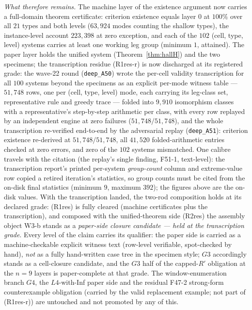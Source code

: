 \emph{What therefore remains.} The machine layer of the existence argument now carries a
full-domain theorem certificate: criterion existence equals layer $0$ at $100\%$ over
all $21$ types and both levels ($63{,}924$ modes counting the shallow types), the
instance-level account $223{,}398$ at zero exception, and each of the $102$
(cell, type, level) systems carries at least one working leg group (minimum $1$,
attained). The paper layer holds the unified system (Theorem~\ref{thm:hallH}) and the
two specimens; the transcription residue \textup{(R1res-r)} is now discharged at its
registered grade: the wave-22 round (\texttt{deep\_A50}) wrote the per-cell validity
transcription for all $100$ systems beyond the specimens as an explicit per-mode
witness table --- $51{,}748$ rows, one per (cell, type, level) mode, each carrying its
leg-class set, representative rule and greedy trace --- folded into $9{,}910$
isomorphism classes with a representative's step-by-step arithmetic per class, with
every row replayed by an independent engine at zero failures
($51{,}748/51{,}748$), and the whole transcription re-verified end-to-end by the
adversarial replay (\texttt{deep\_A51}): criterion existence re-derived at
$51{,}748/51{,}748$, all $41{,}520$ folded-arithmetic entries checked at zero errors,
and zero of the $102$ systems mismatched. One calibre travels with the citation (the
replay's single finding, F51-1, text-level): the transcription report's printed
per-system \emph{group-count} column and extreme-value row copied a retired
iteration's statistics, so group counts must be cited from the on-disk final
statistics (minimum $9$, maximum $392$); the figures above are the on-disk values.
With the transcription landed, the two-rod composition holds at its declared grade:
\textup{(R1res)} is fully cleared (machine certificates plus the transcription), and
composed with the unified-theorem side \textup{(R2res)} the assembly object W3-b
stands as a \emph{paper-side closure candidate --- held at the transcription grade}.
Every level of the claim carries its qualifier: the paper side is carried as a
machine-checkable explicit witness text (row-level verifiable, spot-checked by hand),
\emph{not} as a fully hand-written case tree in the specimen style; $G3$
accordingly stands as a cell-closure candidate, and the $G3$ half of the capped-$R'$
obligation at the $n{=}9$ layers is paper-complete at that grade. The window-enumeration
branch $G4$, the $L4$-with-Inf paper side and the residual F47-2 strong-form
counterexample obligation (carried by the valid replacement example; not part of
\textup{(R1res-r)}) are untouched and not promoted by any of this.

